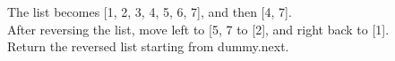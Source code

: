 \documentclass[preview]{standalone}
\begin{document}
The list becomes [1, 2, 3, 4, 5, 6, 7], and then [4, 7].\\After reversing the list, move left to [5, 7 to [2], and right back to [1].\\Return the reversed list starting from dummy.next.\\
\end{document}
